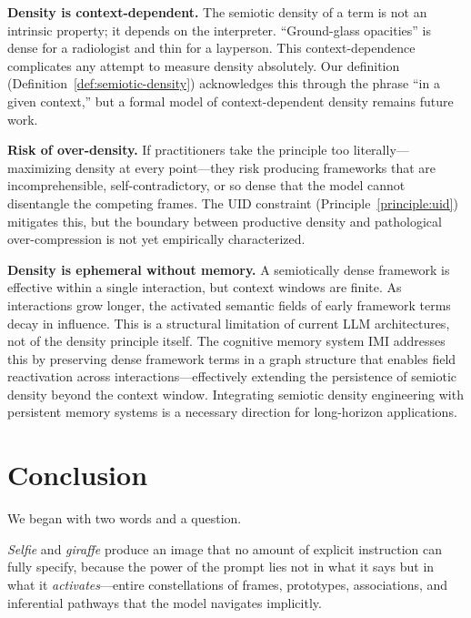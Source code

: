 \documentclass[12pt,a4paper]{article}
\begin{document}
\textbf{Density is context-dependent.}
The semiotic density of a term is not an intrinsic property; it depends on the interpreter.
``Ground-glass opacities'' is dense for a radiologist and thin for a layperson.
This context-dependence complicates any attempt to measure density absolutely.
Our definition (Definition~\ref{def:semiotic-density}) acknowledges this through the phrase ``in a given context,'' but a formal model of context-dependent density remains future work.

\textbf{Risk of over-density.}
If practitioners take the principle too literally---maximizing density at every point---they risk producing frameworks that are incomprehensible, self-contradictory, or so dense that the model cannot disentangle the competing frames.
The UID constraint (Principle~\ref{principle:uid}) mitigates this, but the boundary between productive density and pathological over-compression is not yet empirically characterized.

\textbf{Density is ephemeral without memory.}
A semiotically dense framework is effective within a single interaction, but context windows are finite.
As interactions grow longer, the activated semantic fields of early framework terms decay in influence.
This is a structural limitation of current LLM architectures, not of the density principle itself.
The cognitive memory system IMI \cite{gomes2026imi,gomes2026imitheory} addresses this by preserving dense framework terms in a graph structure that enables field reactivation across interactions---effectively extending the persistence of semiotic density beyond the context window.
Integrating semiotic density engineering with persistent memory systems is a necessary direction for long-horizon applications.


\section{Conclusion}
\label{sec:conclusion}

We began with two words and a question.

\textit{Selfie} and \textit{giraffe} produce an image that no amount of explicit instruction can fully specify, because the power of the prompt lies not in what it says but in what it \textit{activates}---entire constellations of frames, prototypes, associations, and inferential pathways that the model navigates implicitly.
\end{document}
